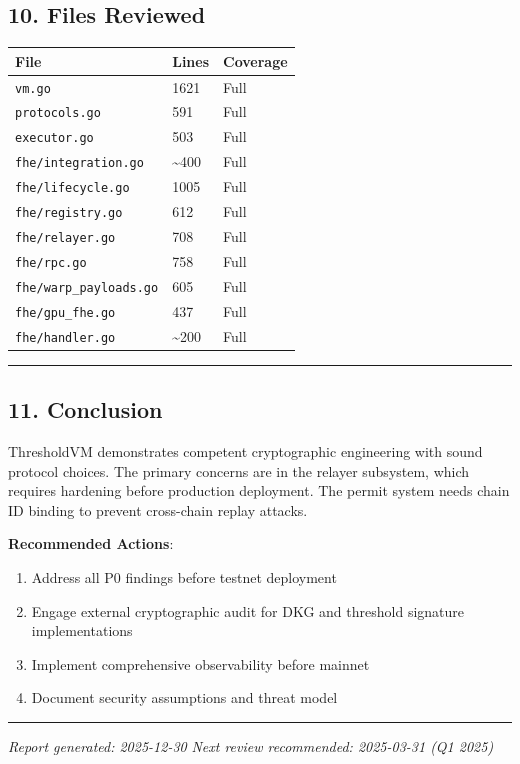 \documentclass[
]{article}
\newcounter{none} %
\providecommand{\tightlist}{%
  \setlength{\itemsep}{0pt}\setlength{\parskip}{0pt}}
\begin{document}
\subsection{10. Files Reviewed}\label{10-files-reviewed}

{\def\LTcaptype{none} %
\begin{longtable}[]{@{}lll@{}}
\toprule\noalign{}
File & Lines & Coverage \\
\midrule\noalign{}
\endhead
\bottomrule\noalign{}
\endlastfoot
\texttt{vm.go} & 1621 & Full \\
\texttt{protocols.go} & 591 & Full \\
\texttt{executor.go} & 503 & Full \\
\texttt{fhe/integration.go} & \textasciitilde400 & Full \\
\texttt{fhe/lifecycle.go} & 1005 & Full \\
\texttt{fhe/registry.go} & 612 & Full \\
\texttt{fhe/relayer.go} & 708 & Full \\
\texttt{fhe/rpc.go} & 758 & Full \\
\texttt{fhe/warp\_payloads.go} & 605 & Full \\
\texttt{fhe/gpu\_fhe.go} & 437 & Full \\
\texttt{fhe/handler.go} & \textasciitilde200 & Full \\
\end{longtable}
}

\begin{center}\rule{0.5\linewidth}{0.5pt}\end{center}

\subsection{11. Conclusion}\label{11-conclusion}

ThresholdVM demonstrates competent cryptographic engineering with sound
protocol choices. The primary concerns are in the relayer subsystem,
which requires hardening before production deployment. The permit system
needs chain ID binding to prevent cross-chain replay attacks.

\textbf{Recommended Actions}:

\begin{enumerate}
\def\labelenumi{\arabic{enumi}.}
\tightlist
\item
  Address all P0 findings before testnet deployment
\item
  Engage external cryptographic audit for DKG and threshold signature
  implementations
\item
  Implement comprehensive observability before mainnet
\item
  Document security assumptions and threat model
\end{enumerate}

\begin{center}\rule{0.5\linewidth}{0.5pt}\end{center}

\emph{Report generated: 2025-12-30} \emph{Next review recommended:
2025-03-31 (Q1 2025)}
\end{document}
